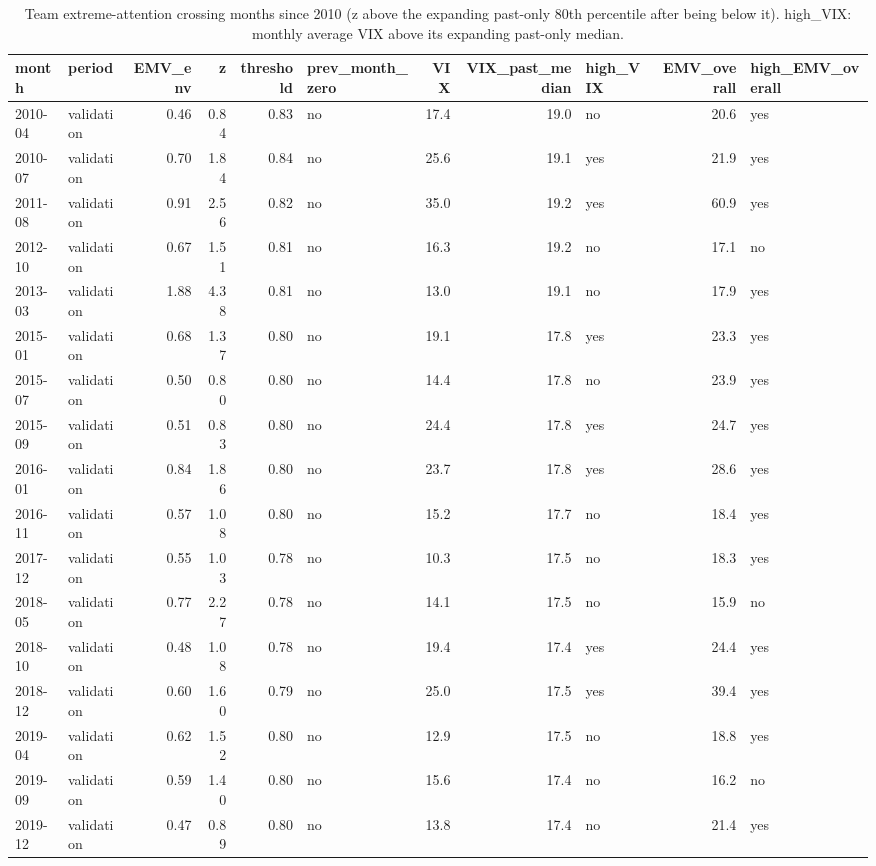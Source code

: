 \begin{table}
\caption{Team extreme-attention crossing months since 2010 (z above the expanding past-only 80th percentile after being below it). high\_VIX: monthly average VIX above its expanding past-only median.}
\label{tab:m1_crossings}
\begin{tabular}{llrrrlrrlrl}
\toprule
month & period & EMV\_env & z & threshold & prev\_month\_zero & VIX & VIX\_past\_median & high\_VIX & EMV\_overall & high\_EMV\_overall \\
\midrule
2010-04 & validation & 0.46 & 0.84 & 0.83 & no & 17.4 & 19.0 & no & 20.6 & yes \\
2010-07 & validation & 0.70 & 1.84 & 0.84 & no & 25.6 & 19.1 & yes & 21.9 & yes \\
2011-08 & validation & 0.91 & 2.56 & 0.82 & no & 35.0 & 19.2 & yes & 60.9 & yes \\
2012-10 & validation & 0.67 & 1.51 & 0.81 & no & 16.3 & 19.2 & no & 17.1 & no \\
2013-03 & validation & 1.88 & 4.38 & 0.81 & no & 13.0 & 19.1 & no & 17.9 & yes \\
2015-01 & validation & 0.68 & 1.37 & 0.80 & no & 19.1 & 17.8 & yes & 23.3 & yes \\
2015-07 & validation & 0.50 & 0.80 & 0.80 & no & 14.4 & 17.8 & no & 23.9 & yes \\
2015-09 & validation & 0.51 & 0.83 & 0.80 & no & 24.4 & 17.8 & yes & 24.7 & yes \\
2016-01 & validation & 0.84 & 1.86 & 0.80 & no & 23.7 & 17.8 & yes & 28.6 & yes \\
2016-11 & validation & 0.57 & 1.08 & 0.80 & no & 15.2 & 17.7 & no & 18.4 & yes \\
2017-12 & validation & 0.55 & 1.03 & 0.78 & no & 10.3 & 17.5 & no & 18.3 & yes \\
2018-05 & validation & 0.77 & 2.27 & 0.78 & no & 14.1 & 17.5 & no & 15.9 & no \\
2018-10 & validation & 0.48 & 1.08 & 0.78 & no & 19.4 & 17.4 & yes & 24.4 & yes \\
2018-12 & validation & 0.60 & 1.60 & 0.79 & no & 25.0 & 17.5 & yes & 39.4 & yes \\
2019-04 & validation & 0.62 & 1.52 & 0.80 & no & 12.9 & 17.5 & no & 18.8 & yes \\
2019-09 & validation & 0.59 & 1.40 & 0.80 & no & 15.6 & 17.4 & no & 16.2 & no \\
2019-12 & validation & 0.47 & 0.89 & 0.80 & no & 13.8 & 17.4 & no & 21.4 & yes \\

\end{tabular}
\end{table}
